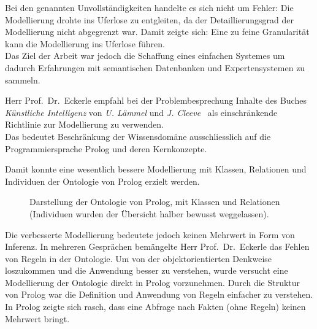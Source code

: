 Bei den genannten Unvollständigkeiten handelte es sich nicht um Fehler: Die Modellierung drohte ins Uferlose zu entgleiten, da der Detaillierungsgrad der Modellierung nicht abgegrenzt war. Damit zeigte sich: Eine zu feine Granularität kann die Modellierung ins Uferlose führen.\\
Das Ziel der Arbeit war jedoch die Schaffung eines einfachen Systemes um dadurch Erfahrungen mit semantischen Datenbanken und Expertensystemen zu sammeln.

Herr Prof.\ Dr.\ Eckerle empfahl bei der Problembesprechung Inhalte des Buches \textit{Künstliche Intelligenz} von \textit{U. Lämmel} und \textit{J. Cleeve}~\cite{laemmel} als einschränkende Richtlinie zur Modellierung zu verwenden.\\
Das bedeutet Beschränkung der Wissensdomäne ausschliesslich auf die Programmiersprache Prolog und deren Kernkonzepte.

Damit konnte eine wesentlich bessere Modellierung mit Klassen, Relationen und Individuen der Ontologie von Prolog erzielt werden.

\begin{figure}[H]
\centering {}
\caption{Darstellung der Ontologie von Prolog, mit Klassen und Relationen (Individuen wurden der Übersicht halber bewusst weggelassen).\label{fig:prolog_baum}\protect\footnotemark}
\end{figure}

Die verbesserte Modellierung bedeutete jedoch keinen Mehrwert in Form von Inferenz. In mehreren Gesprächen bemängelte Herr Prof.\ Dr.\ Eckerle das Fehlen von Regeln in der Ontologie. Um von der objektorientierten Denkweise loszukommen und die Anwendung besser zu verstehen, wurde versucht eine Modellierung der Ontologie direkt in Prolog vorzunehmen. Durch die Struktur von Prolog war die Definition und Anwendung von Regeln einfacher zu verstehen. In Prolog zeigte sich rasch, dass eine Abfrage nach Fakten (ohne Regeln) keinen Mehrwert bringt.

